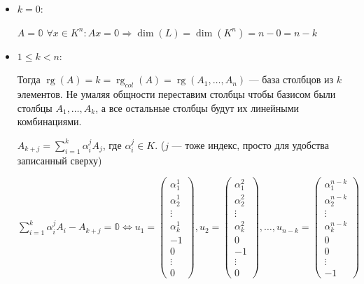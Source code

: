 \documentclass[twoside]{book}
\DeclareMathOperator{\rg}{rg}
\begin{document}
\begin{itemize}
    \item \(k = 0\):

          \(A = \mathbb{0}\) \(\forall x \in K^n: Ax = \mathbb{0} \Rightarrow \dim(L) = \dim(K^n) = n - 0 = n - k\)

    \item \(1\leq k < n\):

          Тогда \(\rg(A) = k = \rg_{col}(A) = \rg(A_1, \ldots, A_n)\) --- база столбцов из \(k\) элементов. Не умаляя общности переставим столбцы чтобы базисом были столбцы \(A_1,\ldots, A_k\), а все остальные столбцы будут их линейными комбинациями.

          \(A_{k + j} = \sum\limits_{i = 1}^k \alpha_i^j A_j\), где \(\alpha_i^j \in K\). (\(j\) --- тоже индекс, просто для удобства записанный сверху)

          \(\sum\limits_{i = 1}^k \alpha_i^j A_i - A_{k + j} = \mathbb{0} \Leftrightarrow
          u_1 = \begin{pmatrix}
              \alpha_1^1 \\
              \alpha_2^1 \\
              \vdots     \\
              \alpha_k^1 \\
              -1         \\
              0          \\
              \vdots     \\
              0
          \end{pmatrix},
          u_2 = \begin{pmatrix}
              \alpha_1^2 \\
              \alpha_2^2 \\
              \vdots     \\
              \alpha_k^2 \\
              0          \\
              -1         \\
              \vdots     \\
              0
          \end{pmatrix}, \ldots,
          u_{n - k} = \begin{pmatrix}
              \alpha_1^{n - k} \\
              \alpha_2^{n - k} \\
              \vdots           \\
              \alpha_k^{n - k} \\
              0                \\
              0                \\
              \vdots           \\
              -1
          \end{pmatrix}\)


\end{itemize}
\end{document}
